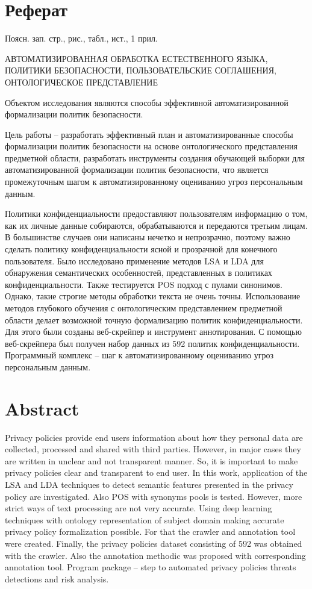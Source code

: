 \documentclass[../main]{subfiles}
\begin{document}
\newpage
{}
\section*{Реферат}
Поясн. зап.  стр.,   рис.,  табл.,  ист., 1 прил.

\begin{jje}
    \MakeUppercase{автоматизированная обработка естественного языка, политики безопасности, пользовательские соглашения, онтологическое представление}
\end{jje}

Объектом  исследования являются способы эффективной автоматизированной формализации политик безопасности.

Цель работы -- разработать эффективный план и автоматизированные способы формализации политик безопасности на основе онтологического представления предметной области, разработать инструменты создания обучающей выборки для автоматизированной формализации политик безопасности, что является промежуточным шагом к автоматизированному оцениванию угроз персональным данным.

Политики конфиденциальности предоставляют пользователям информацию о том, как их личные данные собираются, обрабатываются и передаются третьим лицам. В большинстве случаев они написаны нечетко и непрозрачно, поэтому важно сделать политику конфиденциальности ясной и прозрачной для конечного пользователя. Было исследовано применение методов LSA и LDA для обнаружения семантических особенностей, представленных в политиках конфиденциальности. Также тестируется POS подход с пулами синонимов. Однако, такие строгие методы обработки текста не очень точны. Использование методов глубокого обучения с онтологическим представлением предметной области делает возможной точную формализацию политик конфиденциальности. Для этого были созданы веб-скрейпер и инструмент аннотирования. С помощью веб-скрейпера был получен набор данных из 592 политик конфиденциальности. Программный комплекс -- шаг к автоматизированному оцениванию угроз персональным данным.

\newpage
\section*{Abstract}
Privacy policies provide end users information about how they personal data are collected, processed and shared with third parties. However, in major cases they are written in unclear and not transparent manner. So, it is important to make privacy  policies clear and transparent to end user. In this work, application of the LSA and LDA techniques to detect semantic features presented in the privacy policy are investigated. Also POS with synonyms pools is tested. However, more strict ways of text processing are not very accurate. Using deep learning techniques with ontology representation of subject domain making accurate privacy policy formalization possible. For that the crawler and annotation tool were created. Finally, the privacy policies dataset consisting of 592 was obtained with the crawler. Also the annotation methodic was proposed with corresponding annotation tool. Program package -- step to automated privacy policies threats detections and risk analysis.
\end{document}
